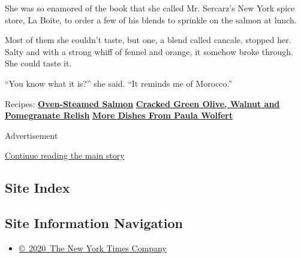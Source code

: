 She was so enamored of the book that she called Mr. Sercarz's New York
spice store, La Boite, to order a few of his blends to sprinkle on the
salmon at lunch.

Most of them she couldn't taste, but one, a blend called cancale,
stopped her. Salty and with a strong whiff of fennel and orange, it
somehow broke through. She could taste it.

``You know what it is?'' she said. ``It reminds me of Morocco.''

Recipes:
\href{https://cooking.nytimes3xbfgragh.onion/recipes/1018664-oven-steamed-salmon}{\textbf{Oven-Steamed
Salmon}} \textbar{}
\href{https://cooking.nytimes3xbfgragh.onion/recipes/1018665-cracked-green-olive-walnut-and-pomegranate-relish}{\textbf{Cracked
Green Olive, Walnut and Pomegranate Relish}} \textbf{\textbar{}}
\href{https://cooking.nytimes3xbfgragh.onion/68861692-nyt-cooking/4933834-paula-wolfert-recipes}{\textbf{More
Dishes From Paula Wolfert}}

Advertisement

\protect\hyperlink{after-bottom}{Continue reading the main story}

\hypertarget{site-index}{%
\subsection{Site Index}\label{site-index}}

\hypertarget{site-information-navigation}{%
\subsection{Site Information
Navigation}\label{site-information-navigation}}

\begin{itemize}
\tightlist
\item
  \href{https://help.nytimes3xbfgragh.onion/hc/en-us/articles/115014792127-Copyright-notice}{©~2020~The
  New York Times Company}
\end{itemize}


